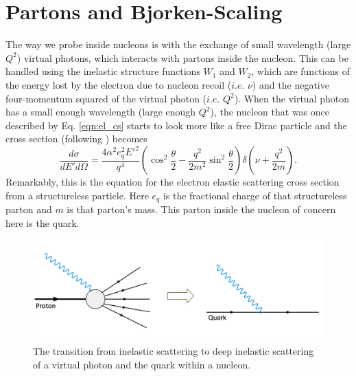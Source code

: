 \section{Partons and Bjorken-Scaling}
The way we probe inside nucleons is with the exchange of small wavelength (large $Q^2$) virtual photons, which interacts with partons inside the nucleon. This can be handled using the inelastic structure functions $W_1$ and $W_2$, which are functions of the energy lost by the electron due to nucleon recoil ($i.e.$ $\nu$) and the negative four-momentum squared of the virtual photon ($i.e.$ $Q^2$). When the virtual photon has a small enough wavelength (large enough $Q^2$), the nucleon that was once described by Eq. \ref{eqn:el_cs} starts to look more like a free Dirac particle and the cross section (following \cite{book:halzen}) becomes
\begin{equation}
\label{eqn:quark_scatt}
\frac{d\sigma}{dE'd\Omega} = \frac{4 \alpha^2 e_q^2 E'^2}{q^4} \left( \cos^2 \frac{\theta}{2} - \frac{q^2}{2m^2}\sin^2 \frac{\theta}{2} \right) \delta \left( \nu + \frac{q^2}{2m} \right).
\end{equation} 
Remarkably, this is the equation for the electron elastic scattering cross section from a structureless particle.\cite{book:halzen} Here $e_q$ is the fractional charge of that structureless parton and $m$ is that parton's mass. This parton inside the nucleon of concern here is the quark.

\begin{figure}[h!]
	\centering
	\includegraphics[width=0.9\linewidth]{figures/inel_to_dis.png}
	\caption{The transition from inelastic scattering to deep inelastic scattering of a virtual photon and the quark within a nucleon.}
	\label{fig:feyn_inel_to_dis}
\end{figure}

